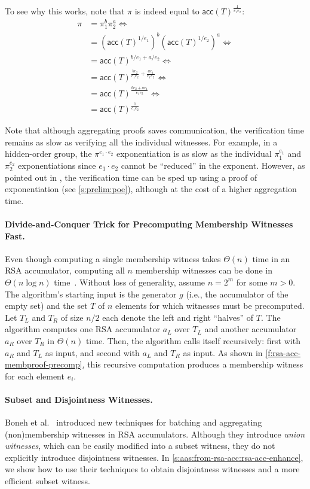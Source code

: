 To see why this works, note that $\pi$ is indeed equal to $\mathsf{acc}(T)^{\frac{1}{e_1 e_2}}$:
\begin{align*}
\pi &= \pi_1^b \pi_2^a\Leftrightarrow\\
              &= \left(\mathsf{acc}(T)^{1/e_1}\right)^b \left(\mathsf{acc}(T)^{1/e_2}\right)^a \Leftrightarrow\\
              &= \mathsf{acc}(T)^{b/e_1+a/e_2} \Leftrightarrow\\
              &= \mathsf{acc}(T)^{\frac{b e_2}{e_1 e_2}+\frac{a e_1}{e_1 e_2}} \Leftrightarrow\\
              &= \mathsf{acc}(T)^\frac{b e_2 + a e_1}{e_1 e_2} \Leftrightarrow\\
              &= \mathsf{acc}(T)^\frac{1}{e_1 e_2}
\end{align*}

Note that although aggregating proofs saves communication, the verification time remains as slow as verifying all the individual witnesses.
For example, in a hidden-order group, the $\pi^{e_1\cdot e_2}$ exponentiation is as slow as the individual $\pi_1^{e_1}$ and $\pi_2^{e_2}$ exponentiations since $e_1 \cdot e_2$ cannot be ``reduced'' in the exponent.
However, as pointed out in \cite{BBF19}, the verification time can be sped up using a proof of exponentiation (see \cref{s:prelim:poe}), although at the cost of a higher aggregation time.

\rsaPrecompFigure

\paragraph{Divide-and-Conquer Trick for Precomputing Membership Witnesses Fast.}
Even though computing a single membership witness takes $\Theta(n)$ time in an RSA accumulator, computing all $n$ membership witnesses can be done in $\Theta(n\log{n})$ time~\cite{SSY01}.
Without loss of generality, assume $n=2^m$ for some $m>0$.
The algorithm's starting input is the generator $g$ (i.e., the accumulator of the empty set) and the set $T$ of $n$ elements for which witnesses must be precomputed.
Let $T_L$ and $T_R$ of size $n/2$ each denote the left and right ``halves'' of $T$.
The algorithm computes one RSA accumulator $a_L$ over $T_L$ and another accumulator $a_R$ over $T_R$ in $\Theta(n)$ time.
Then, the algorithm calls itself recursively: first with $a_R$ and $T_L$ as input, and second with $a_L$ and $T_R$ as input.
As shown in \cref{f:rsa-acc-membproof-precomp}, this recursive computation produces a membership witness for each element $e_i$.

\paragraph{Subset and Disjointness Witnesses.}
Boneh et al.~\cite{BBF19} introduced new techniques for batching and aggregating (non)membership witnesses in RSA accumulators.
Although they introduce \textit{union witnesses}, which can be easily modified into a subset witness, they do not explicitly introduce disjointness witnesses.
In \cref{s:aas:from-rsa-acc:rsa-acc-enhance}, we show how to use their techniques to obtain disjointness witnesses and a more efficient subset witness.
